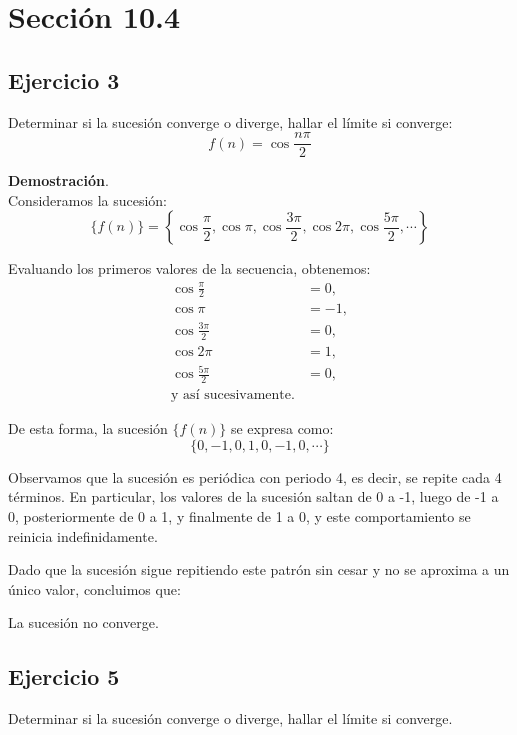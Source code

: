 \documentclass{article}
\begin{document}


\section*{Sección 10.4}
    \subsection*{Ejercicio 3}

    Determinar si la sucesión converge o diverge, hallar el límite si converge:
    $$
    f(n)=\cos \frac{n \pi}{2}
    $$

    \textbf{Demostración}.\\

    Consideramos la sucesión:
    $$
    \{f(n)\}=\left\{\cos \frac{\pi}{2}, \cos \pi, \cos \frac{3 \pi}{2}, \cos 2 \pi, \cos \frac{5 \pi}{2}, \cdots\right\}
    $$

    Evaluando los primeros valores de la secuencia, obtenemos:
    \begin{align*}
    \cos \frac{\pi}{2} &= 0, \\
    \cos \pi &= -1, \\
    \cos \frac{3 \pi}{2} &= 0, \\
    \cos 2 \pi &= 1, \\
    \cos \frac{5 \pi}{2} &= 0, \\
    \text{y así sucesivamente}.
    \end{align*}

    De esta forma, la sucesión $\{f(n)\}$ se expresa como:
    $$
    \{0, -1, 0, 1, 0, -1, 0, \cdots\}
    $$

    Observamos que la sucesión es periódica con periodo 4, es decir, se repite cada 4 términos. En particular, los valores de la sucesión saltan de 0 a -1, luego de -1 a 0, posteriormente de 0 a 1, y finalmente de 1 a 0, y este comportamiento se reinicia indefinidamente.

    Dado que la sucesión sigue repitiendo este patrón sin cesar y no se aproxima a un único valor, concluimos que:

    La sucesión no converge.

    \subsection*{Ejercicio 5}

    Determinar si la sucesión converge o diverge, hallar el límite si converge.
\end{document}
